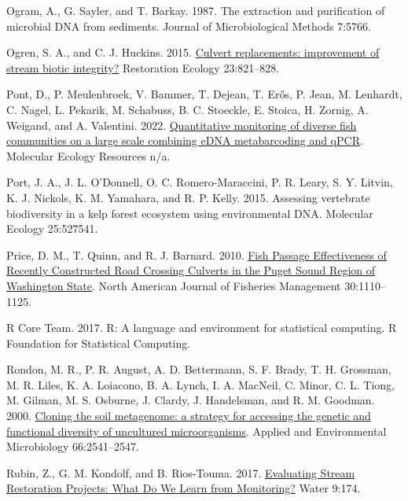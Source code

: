 \documentclass[
]{article}
\newlength{\cslhangindent}
\newlength{\cslentryspacingunit} %
\newenvironment{CSLReferences}[2] %
 {%
  \setlength{\parindent}{0pt}
  \ifodd #1
  \let\oldpar\par
  \def\par{\hangindent=\cslhangindent\oldpar}
  \fi
  \setlength{\parskip}{#2\cslentryspacingunit}
 }%
 {}
\begin{document}
\begin{CSLReferences}{1}{0}
\leavevmode{}%
Ogram, A., G. Sayler, and T. Barkay. 1987. The extraction and
purification of microbial DNA from sediments. Journal of Microbiological
Methods 7:5766.

\leavevmode{}%
Ogren, S. A., and C. J. Huckins. 2015.
\href{https://doi.org/10.1111/rec.12250}{Culvert replacements:
improvement of stream biotic integrity?} Restoration Ecology
23:821--828.

\leavevmode{}%
Pont, D., P. Meulenbroek, V. Bammer, T. Dejean, T. Erős, P. Jean, M.
Lenhardt, C. Nagel, L. Pekarik, M. Schabuss, B. C. Stoeckle, E. Stoica,
H. Zornig, A. Weigand, and A. Valentini. 2022.
\href{https://doi.org/10.1111/1755-0998.13715}{Quantitative monitoring
of diverse fish communities on a large scale combining eDNA
metabarcoding and qPCR}. Molecular Ecology Resources n/a.

\leavevmode{}%
Port, J. A., J. L. O'Donnell, O. C. Romero-Maraccini, P. R. Leary, S. Y.
Litvin, K. J. Nickols, K. M. Yamahara, and R. P. Kelly. 2015. Assessing
vertebrate biodiversity in a kelp forest ecosystem using environmental
DNA. Molecular Ecology 25:527541.

\leavevmode{}%
Price, D. M., T. Quinn, and R. J. Barnard. 2010.
\href{https://doi.org/10.1577/M10-004.1}{Fish Passage Effectiveness of
Recently Constructed Road Crossing Culverts in the Puget Sound Region of
Washington State}. North American Journal of Fisheries Management
30:1110--1125.

\leavevmode{}%
R Core Team. 2017. R: A language and environment for statistical
computing. R Foundation for Statistical Computing.

\leavevmode{}%
Rondon, M. R., P. R. August, A. D. Bettermann, S. F. Brady, T. H.
Grossman, M. R. Liles, K. A. Loiacono, B. A. Lynch, I. A. MacNeil, C.
Minor, C. L. Tiong, M. Gilman, M. S. Osburne, J. Clardy, J. Handelsman,
and R. M. Goodman. 2000.
\href{https://doi.org/10.1128/AEM.66.6.2541-2547.2000}{Cloning the soil
metagenome: a strategy for accessing the genetic and functional
diversity of uncultured microorganisms}. Applied and Environmental
Microbiology 66:2541--2547.

\leavevmode{}%
Rubin, Z., G. M. Kondolf, and B. Rios-Touma. 2017.
\href{https://doi.org/10.3390/w9030174}{Evaluating Stream Restoration
Projects: What Do We Learn from Monitoring?} Water 9:174.


\end{CSLReferences}
\end{document}
